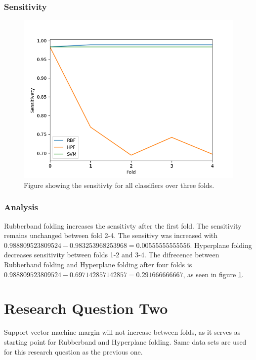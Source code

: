 \documentclass[a4paper,twoside]{bth}
\begin{document}
\subsubsection{Sensitivity}
\begin{figure}[!htb]
\centering
\includegraphics[scale=0.7]{images/result-cancer/Sensitivety.png}
   \caption{Figure showing the sensitivty for all classifiers over three folds.}
   \label{fig:cancer-Sensitivity}
\end{figure}

\FloatBarrier

\subsubsection{Analysis}
Rubberband folding increases the sensitivty after the first fold. The sensitivity remains unchanged between fold 2-4. The sensitivy was increased with $0.988809523809524 - 0.983253968253968 = 0.00555555555556$. Hyperplane folding decreases sensitivity between folds 1-2 and 3-4. The difrecence between Rubberband folding and Hyperplane folding after four folds is $0.988809523809524 - 0.697142857142857 = 0.291666666667$, as seen in figure \ref{fig:cancer-Sensitivity}.

\clearpage
\FloatBarrier



\section{Research Question Two}
 Support vector machine margin will not increase between folds, as it serves as starting point for Rubberband and Hyperplane folding. Same data sets are used for this research question as the previous one. 
\end{document}
